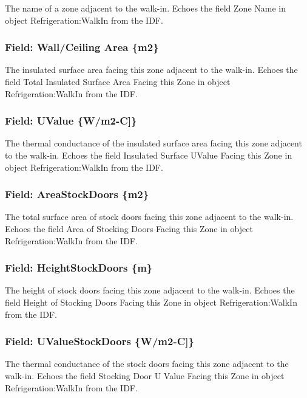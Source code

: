The name of a zone adjacent to the walk-in. Echoes the field Zone Name in object Refrigeration:WalkIn from the IDF.

\subsubsection{Field: Wall/Ceiling Area \{m2\}}\label{field-wallceiling-area-m2}

The insulated surface area facing this zone adjacent to the walk-in. Echoes the field Total Insulated Surface Area Facing this Zone in object Refrigeration:WalkIn from the IDF.

\subsubsection{Field: UValue \{W/m2-C{]}\}}\label{field-uvalue-wm2-c}

The thermal conductance of the insulated surface area facing this zone adjacent to the walk-in. Echoes the field Insulated Surface UValue Facing this Zone in object Refrigeration:WalkIn from the IDF.

\subsubsection{Field: AreaStockDoors \{m2\}}\label{field-areastockdoors-m2}

The total surface area of stock doors facing this zone adjacent to the walk-in. Echoes the field Area of Stocking Doors Facing this Zone in object Refrigeration:WalkIn from the IDF.

\subsubsection{Field: HeightStockDoors \{m\}}\label{field-heightstockdoors-m}

The height of stock doors facing this zone adjacent to the walk-in. Echoes the field Height of Stocking Doors Facing this Zone in object Refrigeration:WalkIn from the IDF.

\subsubsection{Field: UValueStockDoors \{W/m2-C{]}\}}\label{field-uvaluestockdoors-wm2-c}

The thermal conductance of the stock doors facing this zone adjacent to the walk-in. Echoes the field Stocking Door U Value Facing this Zone in object Refrigeration:WalkIn from the IDF.

